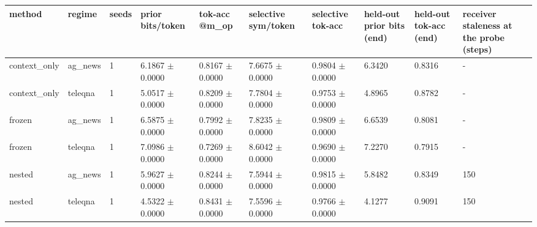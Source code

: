 \begin{tabular}{llllllllll}
\hline
method & regime & seeds & prior bits/token & tok-acc @m\_op & selective sym/token & selective tok-acc & held-out prior bits (end) & held-out tok-acc (end) & receiver staleness at the probe (steps) \\
\hline
context\_only & ag\_news & 1 & 6.1867 $\pm$ 0.0000 & 0.8167 $\pm$ 0.0000 & 7.6675 $\pm$ 0.0000 & 0.9804 $\pm$ 0.0000 & 6.3420 & 0.8316 & - \\
context\_only & teleqna & 1 & 5.0517 $\pm$ 0.0000 & 0.8209 $\pm$ 0.0000 & 7.7804 $\pm$ 0.0000 & 0.9753 $\pm$ 0.0000 & 4.8965 & 0.8782 & - \\
frozen & ag\_news & 1 & 6.5875 $\pm$ 0.0000 & 0.7992 $\pm$ 0.0000 & 7.8235 $\pm$ 0.0000 & 0.9809 $\pm$ 0.0000 & 6.6539 & 0.8081 & - \\
frozen & teleqna & 1 & 7.0986 $\pm$ 0.0000 & 0.7269 $\pm$ 0.0000 & 8.6042 $\pm$ 0.0000 & 0.9690 $\pm$ 0.0000 & 7.2270 & 0.7915 & - \\
nested & ag\_news & 1 & 5.9627 $\pm$ 0.0000 & 0.8244 $\pm$ 0.0000 & 7.5944 $\pm$ 0.0000 & 0.9815 $\pm$ 0.0000 & 5.8482 & 0.8349 & 150 \\
nested & teleqna & 1 & 4.5322 $\pm$ 0.0000 & 0.8431 $\pm$ 0.0000 & 7.5596 $\pm$ 0.0000 & 0.9766 $\pm$ 0.0000 & 4.1277 & 0.9091 & 150 \\
\hline
\end{tabular}
